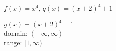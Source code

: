 {$f(x) = x^4$, $g(x) = (x + 2)^{4} + 1$
}
{$g(x) = (x + 2)^{4} + 1$\\
domain: $(-\infty, \infty)$\\
range: $[1, \infty)$

\begin{center}
\end{center}}